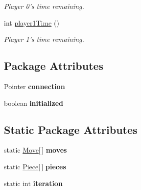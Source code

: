 \begin{DoxyCompactItemize}
\begin{DoxyCompactList}\small\item\em Player 0's time remaining. \item\end{DoxyCompactList}\item 
\hypertarget{classBaseAI_a5a96b2451bf0e2f6567e9e56d59cf7cb}{
int \hyperlink{classBaseAI_a5a96b2451bf0e2f6567e9e56d59cf7cb}{player1Time} ()}
\label{classBaseAI_a5a96b2451bf0e2f6567e9e56d59cf7cb}

\begin{DoxyCompactList}\small\item\em Player 1's time remaining. \item\end{DoxyCompactList}\end{DoxyCompactItemize}
\subsection*{Package Attributes}
\begin{DoxyCompactItemize}
\item 
\hypertarget{classBaseAI_ad9836b270a011daee8411f84590ba35a}{
Pointer {\bfseries connection}}
\label{classBaseAI_ad9836b270a011daee8411f84590ba35a}

\item 
\hypertarget{classBaseAI_a94966bbfdac0d091a7332f19b29935c3}{
boolean {\bfseries initialized}}
\label{classBaseAI_a94966bbfdac0d091a7332f19b29935c3}

\end{DoxyCompactItemize}
\subsection*{Static Package Attributes}
\begin{DoxyCompactItemize}
\item 
\hypertarget{classBaseAI_a60272155e436cb8537f3818db02772eb}{
static \hyperlink{classMove}{Move}\mbox{[}$\,$\mbox{]} {\bfseries moves}}
\label{classBaseAI_a60272155e436cb8537f3818db02772eb}

\item 
\hypertarget{classBaseAI_ab75d25237ef50c6f70ad8387718aa133}{
static \hyperlink{classPiece}{Piece}\mbox{[}$\,$\mbox{]} {\bfseries pieces}}
\label{classBaseAI_ab75d25237ef50c6f70ad8387718aa133}

\item 
\hypertarget{classBaseAI_ad7942cee117a347f7cb841ff4800408f}{
static int {\bfseries iteration}}
\label{classBaseAI_ad7942cee117a347f7cb841ff4800408f}

\end{DoxyCompactItemize}


